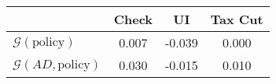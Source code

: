 \begin{tabular}{@{}lccc@{}} 
\toprule 
                          & Check      & UI    & Tax Cut    \\  \midrule 
$\mathcal{G}(\text{policy})$ & 0.007  & -0.039  & 0.000     \\ 
$\mathcal{G}(AD,\text{policy})$ & 0.030  & -0.015  & 0.010     \\ 
\end{tabular}  
